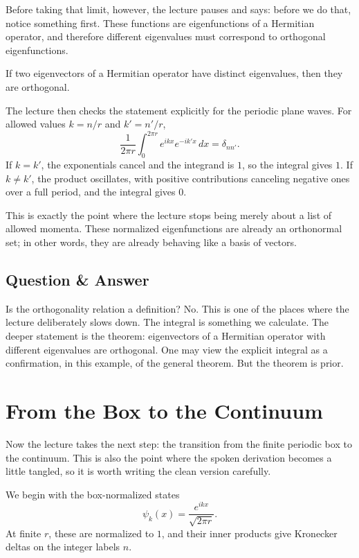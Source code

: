 Before taking that limit, however, the lecture pauses and says: before we do that, notice something first. These functions are eigenfunctions of a Hermitian operator, and therefore different eigenvalues must correspond to orthogonal eigenfunctions.

\begin{theorem}
If two eigenvectors of a Hermitian operator have distinct eigenvalues, then they are orthogonal.
\end{theorem}

The lecture then checks the statement explicitly for the periodic plane waves. For allowed values \(k=n/r\) and \(k'=n'/r\),
\begin{equation}
\frac{1}{2\pi r}\int_0^{2\pi r} e^{ikx}e^{-ik'x}\,dx
=
\delta_{nn'}.
\end{equation}
If \(k=k'\), the exponentials cancel and the integrand is \(1\), so the integral gives \(1\). If \(k\neq k'\), the product oscillates, with positive contributions canceling negative ones over a full period, and the integral gives \(0\).

This is exactly the point where the lecture stops being merely about a list of allowed momenta. These normalized eigenfunctions are already an orthonormal set; in other words, they are already behaving like a basis of vectors.

\subsection{Question \& Answer}

Is the orthogonality relation a definition? No. This is one of the places where the lecture deliberately slows down. The integral is something we calculate. The deeper statement is the theorem: eigenvectors of a Hermitian operator with different eigenvalues are orthogonal. One may view the explicit integral as a confirmation, in this example, of the general theorem. But the theorem is prior.

\section{From the Box to the Continuum}

Now the lecture takes the next step: the transition from the finite periodic box to the continuum. This is also the point where the spoken derivation becomes a little tangled, so it is worth writing the clean version carefully.

We begin with the box-normalized states
\begin{equation}
\psi_k(x)=\frac{e^{ikx}}{\sqrt{2\pi r}}.
\end{equation}
At finite \(r\), these are normalized to \(1\), and their inner products give Kronecker deltas on the integer labels \(n\).

